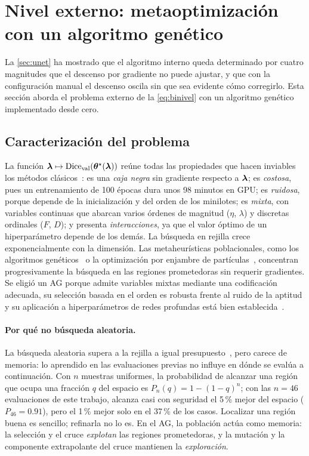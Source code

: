 \section{Nivel externo: metaoptimización con un algoritmo genético}\label{sec:ag}

La \cref{sec:unet} ha mostrado que el algoritmo interno queda determinado por cuatro magnitudes que el descenso por gradiente no puede ajustar, y que con la configuración manual el descenso oscila sin que sea evidente cómo corregirlo. Esta sección aborda el problema externo de la \cref{eq:binivel} con un algoritmo genético implementado desde cero.

\subsection{Caracterización del problema}\label{subsec:caracterizacion}

La función $\bm{\lambda} \mapsto \operatorname{Dice}_{\mathrm{val}}(\bm{\theta}^{\star}(\bm{\lambda}))$ reúne todas las propiedades que hacen inviables los métodos clásicos~\cite{feurer2019hpo}: es una \emph{caja negra} sin gradiente respecto a $\bm{\lambda}$; es \emph{costosa}, pues un entrenamiento de 100 épocas dura unos 98 minutos en GPU; es \emph{ruidosa}, porque depende de la inicialización y del orden de los minilotes; es \emph{mixta}, con variables continuas que abarcan varios órdenes de magnitud ($\eta$, $\lambda$) y discretas ordinales ($F$, $D$); y presenta \emph{interacciones}, ya que el valor óptimo de un hiperparámetro depende de los demás. La búsqueda en rejilla crece exponencialmente con la dimensión. Las metaheurísticas poblacionales, como los algoritmos genéticos~\cite{goldberg1989genetic} o la optimización por enjambre de partículas~\cite{kennedy1995pso}, concentran progresivamente la búsqueda en las regiones prometedoras sin requerir gradientes. Se eligió un AG porque admite variables mixtas mediante una codificación adecuada, su selección basada en el orden es robusta frente al ruido de la aptitud y su aplicación a hiperparámetros de redes profundas está bien establecida~\cite{young2015optimizing}.

\paragraph{Por qué no búsqueda aleatoria.} La búsqueda aleatoria supera a la rejilla a igual presupuesto~\cite{bergstra2012random}, pero carece de memoria: lo aprendido en las evaluaciones previas no influye en dónde se evalúa a continuación. Con $n$ muestras uniformes, la probabilidad de alcanzar una región que ocupa una fracción $q$ del espacio es $P_n(q)=1-(1-q)^{n}$; con las $n=46$ evaluaciones de este trabajo, alcanza casi con seguridad el 5\,\% mejor del espacio ($P_{46}=0.91$), pero el 1\,\% mejor solo en el 37\,\% de los casos. Localizar una región buena es sencillo; refinarla no lo es. En el AG, la población actúa como memoria: la selección y el cruce \emph{explotan} las regiones prometedoras, y la mutación y la componente extrapolante del cruce mantienen la \emph{exploración}.

